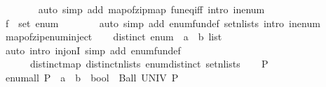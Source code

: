 \begin{isabellebody}
\ \ \ \ \ \ \isamarkupfalse%
\ {\isacharparenleft}{\kern0pt}auto\ simp\ add{\isacharcolon}{\kern0pt}\ map{\isacharunderscore}{\kern0pt}of{\isacharunderscore}{\kern0pt}zip{\isacharunderscore}{\kern0pt}map\ fun{\isacharunderscore}{\kern0pt}eq{\isacharunderscore}{\kern0pt}iff\ intro{\isacharcolon}{\kern0pt}\ in{\isacharunderscore}{\kern0pt}enum{\isacharparenright}{\kern0pt}\isanewline
\ \ \ \ \isamarkupfalse%
\ \isamarkupfalse%
\ {\isachardoublequoteopen}f\ {\isasymin}\ set\ enum{\isachardoublequoteclose}\isanewline
\ \ \ \ \ \ \isamarkupfalse%
\ {\isacharparenleft}{\kern0pt}auto\ simp\ add{\isacharcolon}{\kern0pt}\ enum{\isacharunderscore}{\kern0pt}fun{\isacharunderscore}{\kern0pt}def\ set{\isacharunderscore}{\kern0pt}n{\isacharunderscore}{\kern0pt}lists\ intro{\isacharcolon}{\kern0pt}\ in{\isacharunderscore}{\kern0pt}enum{\isacharparenright}{\kern0pt}\isanewline
\ \ \isamarkupfalse%
\isanewline
{}\isamarkupfalse%
\isanewline
\ \ \isamarkupfalse%
\ map{\isacharunderscore}{\kern0pt}of{\isacharunderscore}{\kern0pt}zip{\isacharunderscore}{\kern0pt}enum{\isacharunderscore}{\kern0pt}inject\isanewline
\ \ \isamarkupfalse%
\ {\isachardoublequoteopen}distinct\ {\isacharparenleft}{\kern0pt}enum\ {\isacharcolon}{\kern0pt}{\isacharcolon}{\kern0pt}\ {\isacharparenleft}{\kern0pt}{\isacharprime}{\kern0pt}a\ {\isasymRightarrow}\ {\isacharprime}{\kern0pt}b{\isacharparenright}{\kern0pt}\ list{\isacharparenright}{\kern0pt}{\isachardoublequoteclose}\isanewline
\ \ \ \ \isamarkupfalse%
\ {\isacharparenleft}{\kern0pt}auto\ intro{\isacharbang}{\kern0pt}{\isacharcolon}{\kern0pt}\ inj{\isacharunderscore}{\kern0pt}onI\ simp\ add{\isacharcolon}{\kern0pt}\ enum{\isacharunderscore}{\kern0pt}fun{\isacharunderscore}{\kern0pt}def\isanewline
\ \ \ \ \ \ distinct{\isacharunderscore}{\kern0pt}map\ distinct{\isacharunderscore}{\kern0pt}n{\isacharunderscore}{\kern0pt}lists\ enum{\isacharunderscore}{\kern0pt}distinct\ set{\isacharunderscore}{\kern0pt}n{\isacharunderscore}{\kern0pt}lists{\isacharparenright}{\kern0pt}\isanewline
{}\isamarkupfalse%
\isanewline
\ \ \isamarkupfalse%
\ P\isanewline
\ \ \isamarkupfalse%
\ {\isachardoublequoteopen}enum{\isacharunderscore}{\kern0pt}all\ {\isacharparenleft}{\kern0pt}P\ {\isacharcolon}{\kern0pt}{\isacharcolon}{\kern0pt}\ {\isacharparenleft}{\kern0pt}{\isacharprime}{\kern0pt}a\ {\isasymRightarrow}\ {\isacharprime}{\kern0pt}b{\isacharparenright}{\kern0pt}\ {\isasymRightarrow}\ bool{\isacharparenright}{\kern0pt}\ {\isacharequal}{\kern0pt}\ Ball\ UNIV\ P{\isachardoublequoteclose}\isanewline

\end{isabellebody}
